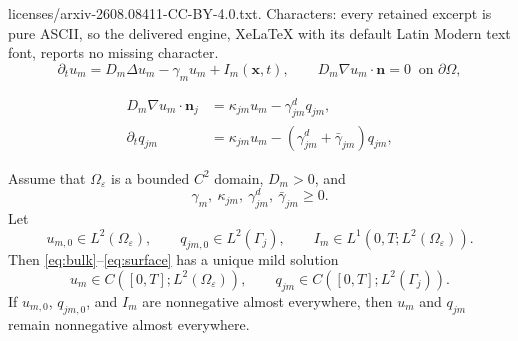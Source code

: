 \documentclass[10pt,a4paper]{amsart}
\begin{document}
licenses/arxiv-2608.08411-CC-BY-4.0.txt. Characters: every retained excerpt is pure ASCII, so the delivered engine, XeLaTeX with its default Latin Modern text font, reports no missing character.
\begin{equation}
\partial_tu_m=D_m\Delta u_m-\gamma_mu_m+I_m(\mathbf x,t),\qquad
D_m\nabla u_m\cdot\mathbf n=0\ \text{ on }\partial\Omega,
\label{eq:bulk}
\end{equation}

\begin{subequations}\label{eq:surface}
\begin{align}
D_m\nabla u_m\cdot\mathbf n_j&=\kappa_{jm}u_m-\gamma^d_{jm}q_{jm},\\
\partial_tq_{jm}&=\kappa_{jm}u_m-(\gamma^d_{jm}+\bar\gamma_{jm})q_{jm},
\end{align}
\end{subequations}

\begin{proposition}
\label{prop:bulk_surface_wellposed}
Assume that $\Omega_\varepsilon$ is a bounded $C^2$ domain, $D_m>0$, and
\[
\gamma_m,\ \kappa_{jm},\ \gamma^d_{jm},\ \bar\gamma_{jm}\geq0.
\]
Let
\[
u_{m,0}\in L^2(\Omega_\varepsilon),\qquad
q_{jm,0}\in L^2(\Gamma_j),\qquad
I_m\in L^1\!\left(0,T;L^2(\Omega_\varepsilon)\right).
\]
Then \eqref{eq:bulk}--\eqref{eq:surface} has a unique mild solution
\[
u_m\in C\!\left([0,T];L^2(\Omega_\varepsilon)\right),\qquad
q_{jm}\in C\!\left([0,T];L^2(\Gamma_j)\right).
\]
If $u_{m,0}$, $q_{jm,0}$, and $I_m$ are nonnegative almost everywhere, then
$u_m$ and $q_{jm}$ remain nonnegative almost everywhere.
\end{proposition}
\end{document}
